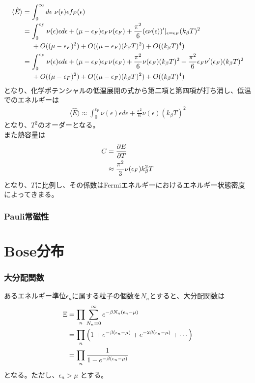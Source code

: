 \documentclass[dvipdfmx, 11pt, a4paper]{jsarticle}
\theoremstyle{definition}
\begin{document}
    \begin{align}
        \langle \hat{E} \rangle &= \int_0^{\infty} d\epsilon\ \nu (\epsilon) \epsilon f_F(\epsilon) \notag \\
        &= \int_0^{\epsilon_F} \nu (\epsilon) \epsilon d\epsilon + (\mu - \epsilon_F)\epsilon_F \nu(\epsilon_F)  + \frac{\pi^2}{6} (\epsilon \nu(\epsilon))'|_{\epsilon = \epsilon_F}(k_\beta T)^2 \notag \\
        &\ \ \ \ + O((\mu - \epsilon_F)^2) +O((\mu - \epsilon_F)(k_\beta T)^2) + O((k_\beta T)^4) \notag \\
        &= \int_0^{\epsilon_F} \nu (\epsilon) \epsilon d\epsilon + (\mu - \epsilon_F)\epsilon_F \nu(\epsilon_F)  + \frac{\pi^2}{6} \nu(\epsilon_F)(k_\beta T)^2 + \frac{\pi^2}{6} \epsilon_F \nu'(\epsilon_F)(k_\beta T)^2 \notag \\
        &\ \ \ \ + O((\mu - \epsilon_F)^2) +O((\mu - \epsilon_F)(k_\beta T)^2) + O((k_\beta T)^4) \notag 
    \end{align}
    となり、化学ポテンシャルの低温展開の式から第二項と第四項が打ち消し、低温でのエネルギーは
    \begin{align}
        \langle \hat{E} \rangle \approx \int_0^{\epsilon_F} \nu (\epsilon) \epsilon d\epsilon  + \frac{\pi^2}{6} \nu(\epsilon)(k_\beta T)^2 
    \end{align}
    となり、$T^2$のオーダーとなる。\\
    また熱容量は
    \begin{align}
        C &= \frac{\partial E}{\partial T} \notag \\
        &\approx  \frac{\pi^2}{3} \nu(\epsilon_F)k_\beta^2  T
    \end{align}
    となり、$T$に比例し、その係数はFermiエネルギーにおけるエネルギー状態密度によってきまる。
\subsubsection{Pauli常磁性}
\section{Bose分布}
\subsubsection{大分配関数}
    あるエネルギー準位$\epsilon_n$に属する粒子の個数を$N_n$とすると、大分配関数は
    \begin{align}
        \Xi &= \prod_n \sum_{N_n = 0}^{\infty} e^{-\beta N_n (\epsilon_n - \mu)} \notag \\
        &= \prod_n \left( 1 + e^{-\beta (\epsilon_n - \mu )} + e^{-2\beta (\epsilon_n - \mu )} + \cdots \right) \notag \\
        &= \prod_n \frac{1}{1 - e^{-\beta (\epsilon_n - \mu)}}
    \end{align}
    となる。ただし、$\epsilon_n > \mu$ とする。
\end{document}
